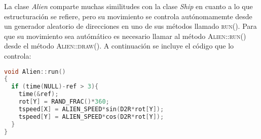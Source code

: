 La clase \emph{Alien} comparte muchas similitudes con la clase \emph{Ship} en cuanto a lo que estructuración se refiere, pero su movimiento se controla autónomamemte desde un generador aleatorio de direcciones en uno de sus métodos llamado \textsc{run()}. Para que su movimiento sea autómático es necesario llamar al método \textsc{Alien::run()} desde el método \textsc{Alien::draw()}. A continuación se incluye el código que lo controla:

\lstset{style=mystyle}
\begin{lstlisting}[language=C++, title=Movimiento errático del \emph{Alien} gracias a la función \textsc{run()}, frame=single, numbers=none]
void Alien::run()
{ 
  if (time(NULL)-ref > 3){
    time(&ref);
    rot[Y] = RAND_FRAC()*360;
    tspeed[X] = ALIEN_SPEED*sin(D2R*rot[Y]);
    tspeed[Y] = ALIEN_SPEED*cos(D2R*rot[Y]);
  }
}
\end{lstlisting}